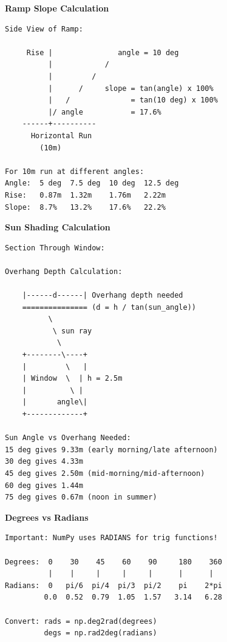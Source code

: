 \begin{tcolorbox}[
    title=Trigonometry in engineering and architecture,
    colframe=purple,
    colback = white,
    arc=2mm
]
\textbf{Ramp Slope Calculation}
\begin{lstlisting}[basicstyle=\ttfamily\footnotesize,breaklines=true,columns=fullflexible,keepspaces=true,xleftmargin=0pt]
Side View of Ramp:
                          
     Rise |               angle = 10 deg
          |            /
          |         /
          |      /     slope = tan(angle) x 100%
          |   /              = tan(10 deg) x 100%
          |/ angle           = 17.6%
    ------+----------
      Horizontal Run
        (10m)

For 10m run at different angles:
Angle:  5 deg  7.5 deg  10 deg  12.5 deg
Rise:   0.87m  1.32m    1.76m   2.22m
Slope:  8.7%   13.2%    17.6%   22.2%

\end{lstlisting}

\textbf{Sun Shading Calculation}
\begin{lstlisting}[basicstyle=\ttfamily\footnotesize,breaklines=true,columns=fullflexible,keepspaces=true,xleftmargin=0pt]
Section Through Window:

Overhang Depth Calculation:
                    
    |------d------| Overhang depth needed
    =============== (d = h / tan(sun_angle))
          \
           \ sun ray
            \
    +--------\----+
    |         \   |
    | Window  \  | h = 2.5m
    |          \ |
    |       angle\|
    +-------------+
    
Sun Angle vs Overhang Needed:
15 deg gives 9.33m (early morning/late afternoon)
30 deg gives 4.33m 
45 deg gives 2.50m (mid-morning/mid-afternoon)
60 deg gives 1.44m 
75 deg gives 0.67m (noon in summer)

\end{lstlisting}

\textbf{Degrees vs Radians}
\begin{lstlisting}[basicstyle=\ttfamily\footnotesize,breaklines=true,columns=fullflexible,keepspaces=true,xleftmargin=0pt]
Important: NumPy uses RADIANS for trig functions!

Degrees:  0    30    45    60    90     180    360
          |    |     |     |     |      |      |
Radians:  0   pi/6  pi/4  pi/3  pi/2    pi    2*pi
         0.0  0.52  0.79  1.05  1.57   3.14   6.28

Convert: rads = np.deg2rad(degrees)
         degs = np.rad2deg(radians)

\end{lstlisting}
\end{tcolorbox}

